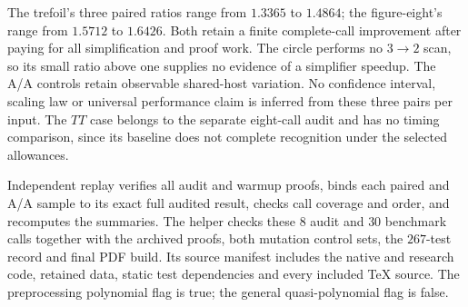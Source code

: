 The trefoil's three paired ratios range from $1.3365$ to $1.4864$;
the figure-eight's range from $1.5712$ to $1.6426$.  Both retain a
finite complete-call improvement after paying for all simplification
and proof work.  The circle performs no $3\to2$ scan, so its small
ratio above one supplies no evidence of a simplifier speedup.  The
A/A controls retain observable shared-host variation.  No confidence
interval, scaling law or universal performance claim is inferred from
these three pairs per input.  The $TT$ case belongs to the separate
eight-call audit and has no timing comparison, since its baseline
does not complete recognition under the selected allowances.

Independent replay verifies all audit and warmup proofs, binds each
paired and A/A sample to its exact full audited result, checks call
coverage and order, and recomputes the summaries.  The helper
 checks these $8$ audit and
$30$ benchmark calls together with the archived proofs, both mutation
control sets, the $267$-test record and final PDF build.  Its source
manifest includes the native and research code, retained data, static
test dependencies and every included TeX source.  The preprocessing
polynomial flag is true; the general quasi-polynomial flag is false.
